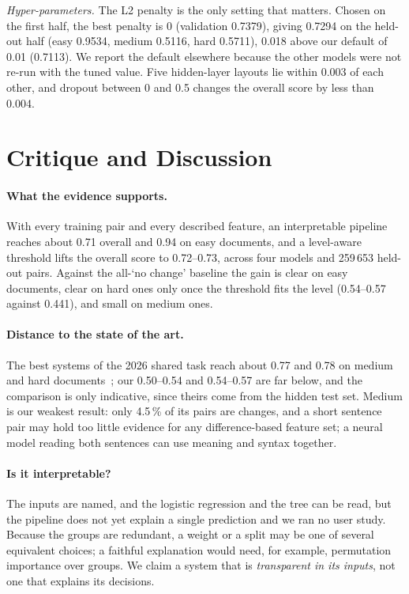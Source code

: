 \documentclass[runningheads]{llncs}
\begin{document}
\emph{Hyper-parameters.} The L2 penalty is the only setting that matters. Chosen on the first half, the best penalty is 0 (validation 0.7379), giving 0.7294 on the held-out half (easy 0.9534, medium 0.5116, hard 0.5711), 0.018 above our default of 0.01 (0.7113). We report the default elsewhere because the other models were not re-run with the tuned value. Five hidden-layer layouts lie within 0.003 of each other, and dropout between 0 and 0.5 changes the overall score by less than 0.004.

\section{Critique and Discussion}
\label{sec:discussion}

\paragraph{What the evidence supports.} With every training pair and every described feature, an interpretable pipeline reaches about 0.71 overall and 0.94 on easy documents, and a level-aware threshold lifts the overall score to 0.72--0.73, across four models and 259\,653 held-out pairs. Against the all-`no change' baseline the gain is clear on easy documents, clear on hard ones only once the threshold fits the level (0.54--0.57 against 0.441), and small on medium ones.

\paragraph{Distance to the state of the art.} The best systems of the 2026 shared task reach about 0.77 and 0.78 on medium and hard documents~\cite{zangerle:2026}; our 0.50--0.54 and 0.54--0.57 are far below, and the comparison is only indicative, since theirs come from the hidden test set. Medium is our weakest result: only 4.5\,\% of its pairs are changes, and a short sentence pair may hold too little evidence for any difference-based feature set; a neural model reading both sentences can use meaning and syntax together.

\paragraph{Is it interpretable?} The inputs are named, and the logistic regression and the tree can be read, but the pipeline does not yet explain a single prediction and we ran no user study. Because the groups are redundant, a weight or a split may be one of several equivalent choices; a faithful explanation would need, for example, permutation importance over groups. We claim a system that is \emph{transparent in its inputs}, not one that explains its decisions.
\end{document}
